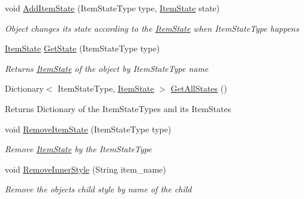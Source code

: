 \begin{DoxyCompactItemize}
void \mbox{\hyperlink{class_space_v_i_l_1_1_decorations_1_1_style_a738cd9c81f6a8b10a2a59de982ebdf6d}{Add\+Item\+State}} (Item\+State\+Type type, \mbox{\hyperlink{class_space_v_i_l_1_1_decorations_1_1_item_state}{Item\+State}} state)
\begin{DoxyCompactList}\small\item\em Object changes its state according to the \mbox{\hyperlink{class_space_v_i_l_1_1_decorations_1_1_item_state}{Item\+State}} when Item\+State\+Type happens \end{DoxyCompactList}\item 
\mbox{\hyperlink{class_space_v_i_l_1_1_decorations_1_1_item_state}{Item\+State}} \mbox{\hyperlink{class_space_v_i_l_1_1_decorations_1_1_style_a05cf6e203731473665ab67f8d784a2b0}{Get\+State}} (Item\+State\+Type type)
\begin{DoxyCompactList}\small\item\em Returns \mbox{\hyperlink{class_space_v_i_l_1_1_decorations_1_1_item_state}{Item\+State}} of the object by Item\+State\+Type name \end{DoxyCompactList}\item 
\mbox{\label{class_space_v_i_l_1_1_decorations_1_1_style_af6063cc31f063c459d5e5169912aec7d}} 
Dictionary$<$ Item\+State\+Type, \mbox{\hyperlink{class_space_v_i_l_1_1_decorations_1_1_item_state}{Item\+State}} $>$ \mbox{\hyperlink{class_space_v_i_l_1_1_decorations_1_1_style_af6063cc31f063c459d5e5169912aec7d}{Get\+All\+States}} ()
\begin{DoxyCompactList}\small\item\em \begin{DoxyReturn}{Returns}
Dictionary of the Item\+State\+Types and its Item\+States 
\end{DoxyReturn}
\end{DoxyCompactList}\item 
void \mbox{\hyperlink{class_space_v_i_l_1_1_decorations_1_1_style_a84dcc9ea332cd7950e166307050124a0}{Remove\+Item\+State}} (Item\+State\+Type type)
\begin{DoxyCompactList}\small\item\em Remove \mbox{\hyperlink{class_space_v_i_l_1_1_decorations_1_1_item_state}{Item\+State}} by the Item\+State\+Type \end{DoxyCompactList}\item 
void \mbox{\hyperlink{class_space_v_i_l_1_1_decorations_1_1_style_a34f1cc39bddef7663fca7c301256a3e5}{Remove\+Inner\+Style}} (String item\+\_\+name)
\begin{DoxyCompactList}\small\item\em Remove the object\textquotesingle{}s child style by name of the child \end{DoxyCompactList}\end{DoxyCompactItemize}
